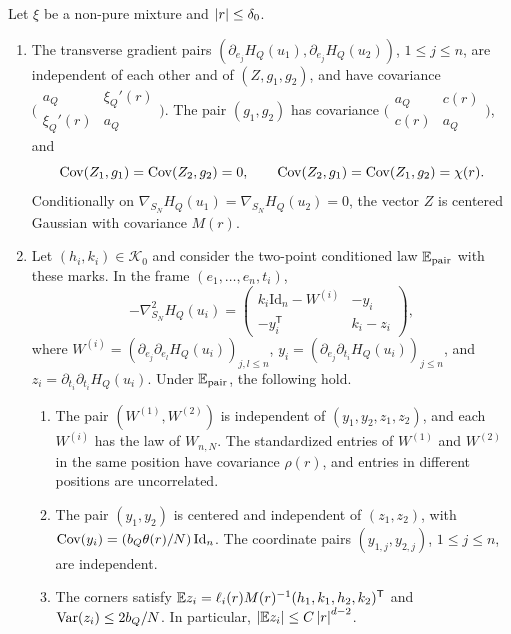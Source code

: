 \begin{lemma}\label{lem:mp-regression}
Let $\xi$ be a non-pure mixture and $\left|r\right|\le\delta_0$.
\begin{enumerate}[label=(\alph*)]
\item The transverse gradient pairs $(\partial_{e_j}H_Q(u_1),\partial_{e_j}H_Q(u_2))$, $1\le j\le n$, are independent of each other and of $(Z,g_1,g_2)$, and have covariance $\bigl(\begin{smallmatrix}a_Q&\xi_Q'(r)\\ \xi_Q'(r)&a_Q\end{smallmatrix}\bigr)$. The pair $(g_1,g_2)$ has covariance $\bigl(\begin{smallmatrix}a_Q&c(r)\\c(r)&a_Q\end{smallmatrix}\bigr)$, and
\begin{equation}\label{eq:mp-mark-gradient}
\operatorname{Cov}(Z_1,g_1)=\operatorname{Cov}(Z_2,g_2)=0,\qquad \operatorname{Cov}(Z_2,g_1)=\operatorname{Cov}(Z_1,g_2)=\chi(r).
\end{equation}
Conditionally on $\nabla_{S_N}H_Q(u_1)=\nabla_{S_N}H_Q(u_2)=0$, the vector $Z$ is centered Gaussian with covariance $M(r)$.
\item Let $(h_i,k_i)\in\mathcal K_0$ and consider the two-point conditioned law $\mathbb E_{\mathrm{pair}}$ with these marks. In the frame $(e_1,\dots,e_n,t_i)$,
\begin{equation}\label{eq:mp-hessian-blocks}
-\nabla^2_{S_N}H_Q(u_i)=\begin{pmatrix}k_i\mathrm{Id}_n-W^{(i)}&-y_i\\-y_i^{\mathsf T}&k_i-z_i\end{pmatrix},
\end{equation}
where $W^{(i)}=(\partial_{e_j}\partial_{e_l}H_Q(u_i))_{j,l\le n}$, $y_i=(\partial_{e_j}\partial_{t_i}H_Q(u_i))_{j\le n}$, and $z_i=\partial_{t_i}\partial_{t_i}H_Q(u_i)$. Under $\mathbb E_{\mathrm{pair}}$, the following hold.
\begin{enumerate}[label=(\roman*)]
\item The pair $(W^{(1)},W^{(2)})$ is independent of $(y_1,y_2,z_1,z_2)$, and each $W^{(i)}$ has the law of $W_{n,N}$. The standardized entries of $W^{(1)}$ and $W^{(2)}$ in the same position have covariance $\rho(r)$, and entries in different positions are uncorrelated.
\item The pair $(y_1,y_2)$ is centered and independent of $(z_1,z_2)$, with $\operatorname{Cov}(y_i)=(b_Q\theta(r)/N)\,\mathrm{Id}_n$. The coordinate pairs $(y_{1,j},y_{2,j})$, $1\le j\le n$, are independent.
\item The corners satisfy $\mathbb E z_i=\ell_i(r)M(r)^{-1}(h_1,k_1,h_2,k_2)^{\mathsf T}$ and $\operatorname{Var}(z_i)\le2b_Q/N$. In particular, $\left|\mathbb E z_i\right|\le C\left|r\right|^{d-2}$.
\end{enumerate}
\end{enumerate}
\end{lemma}

